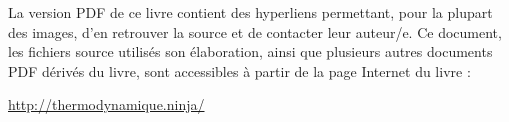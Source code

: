 {	La version PDF de ce livre contient des hyperliens permettant, pour la plupart des images, d’en retrouver la source et de contacter leur auteur/e. Ce document, les fichiers source utilisés son élaboration, ainsi que plusieurs autres documents PDF dérivés du livre, sont accessibles à partir de la page Internet du livre :

		\begin{center}\href{http://thermodynamique.ninja/}{http://thermodynamique.ninja/}\end{center}
}

